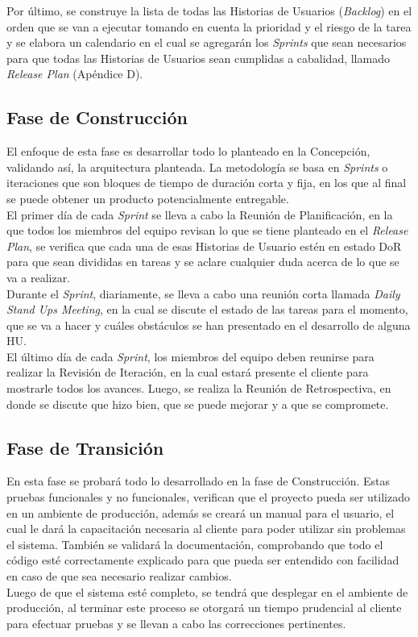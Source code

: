 Por último, se construye la lista de todas las Historias de Usuarios (\textit{Backlog}) en el orden que se van a ejecutar tomando en cuenta la prioridad y el riesgo de la tarea y se elabora un calendario en el cual se agregarán los \textit{Sprints} que sean necesarios para que todas las Historias de Usuarios sean cumplidas a cabalidad, llamado \textit{Release Plan} (Apéndice D).

\subsection{Fase de Construcción}

El enfoque de esta fase es desarrollar todo lo planteado en la Concepción, validando así, la arquitectura planteada. La metodología se basa en \textit{Sprints} o iteraciones que son bloques de tiempo de duración corta y fija, en los que al final se puede obtener un producto potencialmente entregable. \\

El primer día de cada \textit{Sprint} se lleva a cabo la Reunión de Planificación, en la que todos los miembros del equipo revisan lo que se tiene planteado en el \textit{Release Plan}, se verifica que cada una de esas Historias de Usuario estén en estado DoR para que sean divididas en tareas y se aclare cualquier duda acerca de lo que se va a realizar. \\

Durante el \textit{Sprint}, diariamente, se lleva a cabo una reunión corta llamada \textit{Daily Stand Ups Meeting}, en la cual se discute el estado de las tareas para el momento, que se va a hacer y cuáles obstáculos se han presentado en el desarrollo de alguna HU.\\

El último día de cada \textit{Sprint}, los miembros del equipo deben reunirse para realizar la Revisión de Iteración, en la cual estará presente el cliente para mostrarle todos los avances. Luego, se realiza la Reunión de Retrospectiva, en donde se discute que hizo bien, que se puede mejorar y a que se compromete.

\subsection{Fase de Transición}

En esta fase se probará todo lo desarrollado en la fase de Construcción. Estas pruebas funcionales y no funcionales, verifican que el proyecto pueda ser utilizado en un ambiente de producción, además se creará un manual para el usuario, el cual le dará la capacitación necesaria al cliente para poder utilizar sin problemas el sistema. También se validará la documentación, comprobando que todo el código esté correctamente explicado para que pueda ser entendido con facilidad en caso de que sea necesario realizar cambios.\\

Luego de que el sistema esté completo, se tendrá que desplegar en el ambiente de producción, al terminar este proceso se otorgará un tiempo prudencial al cliente para efectuar pruebas y se llevan a cabo las correcciones pertinentes.
